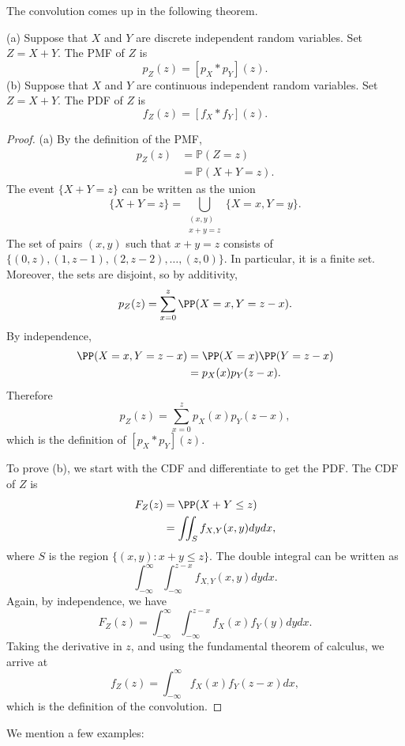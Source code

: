 \documentclass{ximera}
\begin{document}
The convolution comes up in the following theorem.
\begin{theorem}
(a) Suppose that $X$ and $Y$ are discrete independent random variables. Set $Z=X+Y$. The PMF of $Z$ is
$$
p_Z(z) = \left[p_X * p_Y\right](z).
$$
(b) Suppose that $X$ and $Y$ are continuous independent random variables. Set $Z=X+Y$. The PDF of $Z$ is
$$
f_Z(z) = \left[f_X * f_Y\right](z).
$$
\end{theorem}
\begin{proof}

(a) By the definition of the PMF, 
\begin{align*}
p_Z(z) &= \mathbb{P}(Z = z) \\
&= \mathbb{P}(X+Y=z).
\end{align*}
The event $\{ X+Y = z\}$ can be written as the union 
$$
\{X+Y =z \} = \bigcup_{\substack{(x,y) \\ x+y=z}} \{ X=x,Y=y\}.
$$
The set of pairs $(x,y)$ such that $x+y=z$ consists of $\{(0,z),(1,z-1),(2,z-2),\ldots,(z,0)\}$. In particular, it is a finite set. Moreover, the sets are disjoint, so by additivity,
$$
p_Z(z) = \sum_{x=0}^z \PP(X=x,Y=z-x).
$$
By independence, 
\begin{align*}
\PP(X=x,Y=z-x) &= \PP(X=x) \PP(Y=z-x)\\
&= p_X(x) p_Y(z-x). 
\end{align*}
Therefore 
$$
p_Z(z) = \sum_{x=0}^z p_X(x) p_Y(z-x),
$$
which is the definition of $\left[p_X * p_Y\right](z)$.

To prove (b), we start with the CDF and differentiate to get the PDF. The CDF of $Z$ is
\begin{align*}
F_Z(z) &= \PP(X+Y \leq z) \\
&= \iint_S f_{X,Y}(x,y)dy dx ,
\end{align*}
where $S$ is the region $\{(x,y): x+y \leq z\}$. The double integral can be written as 
$$
\int_{-\infty }^{\infty} \int_{-\infty}^{z-x} f_{X,Y}(x,y)  dy dx.
$$
Again, by independence, we have
$$
F_Z(z) = \int_{-\infty}^{\infty}  \int_{-\infty}^{z-x} f_{X}(x) f_Y(y)  dy dx.
$$
Taking the derivative in $z$, and using the fundamental theorem of calculus, we arrive at 
$$
f_Z(z) = \int_{-\infty}^{\infty}  f_X(x) f_Y(z-x)dx,
$$
which is the definition of the convolution.
\end{proof}

We mention a few examples:
\end{document}
